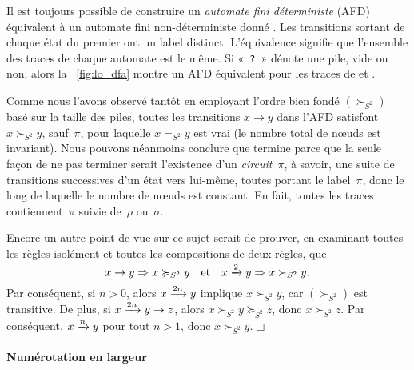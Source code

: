 Il est toujours possible de construire un \emph{automate fini
  déterministe} (AFD) équivalent à un automate fini non-déterministe
donné \citep{VanLeeuwen_1990c,HopcroftMotwaniUllman_2003}. Les
transitions sortant de chaque état du premier ont un label
distinct. L'équivalence signifie que l'ensemble des traces de chaque
automate est le même. Si «~\texttt{?}~» dénote une pile, vide ou non,
alors la \fig~\vref{fig:lo_dfa} montre un AFD équivalent pour les
traces de  et
.

Comme nous l'avons observé tantôt en employant l'ordre bien fondé
\((\succ_{S^2})\) basé sur la taille des piles, toutes les transitions
\(x \rightarrow y\) dans l'AFD satisfont \(x \succ_{S^2} y\),
sauf~\(\pi\), pour laquelle \(x =_{S^2} y\) est vrai (le nombre total
de n{\oe}uds est invariant). Nous pouvons néanmoins conclure que
 termine parce que la seule façon de ne pas terminer serait
l'existence d'un \emph{circuit}~\(\pi\), à savoir, une suite de
transitions successives d'un état vers lui-même, toutes portant le
label~\(\pi\), donc le long de laquelle le nombre de n{\oe}uds est
constant. En fait, toutes les traces contiennent~\(\pi\) suivie
de~\(\rho\) ou~\(\sigma\).

Encore un autre point de vue sur ce sujet serait de prouver, en
examinant toutes les règles isolément et toutes les compositions de
deux règles, que
\begin{equation*}
x \rightarrow y \Rightarrow x \succcurlyeq_{S^2} y
\quad \text{et} \quad
x \xrightarrow{\smash{2}} y \Rightarrow x \succ_{S^2} y.
\end{equation*}
Par conséquent, si \(n > 0\), alors \(x \xrightarrow{\smash{2n}} y\)
implique \(x \succ_{S^2} y\), car \((\succ_{S^2})\) est transitive. De
plus, si \(x \xrightarrow{\smash{2n}} y \rightarrow z\), alors \(x
\succ_{S^2} y \succcurlyeq_{S^2} z\), donc \(x \succ_{S^2} z\). Par
conséquent, \(x \xrightarrow{\smash{n}} y\) pour tout \(n > 1\), donc
\(x \succ_{S^2} y\).\hfill\(\Box\)

\paragraph{Numérotation en largeur}

